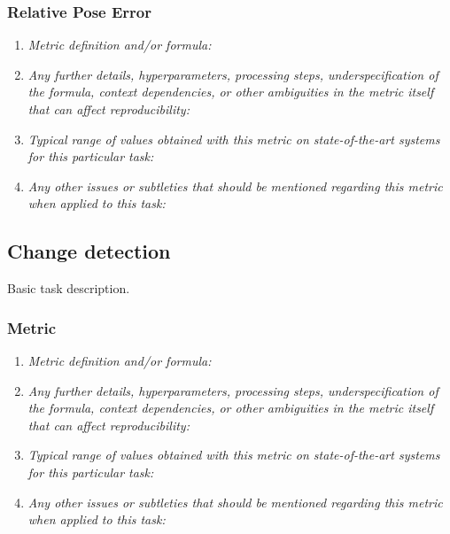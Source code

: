 \documentclass[a4paper,11pt]{article}
\begin{document}
        \subsubsection{Relative Pose Error}
            \begin{enumerate}[label=\alph*.]
                \item \textit{Metric definition and/or formula:}
                \bigskip
                \item \textit{Any further details, hyperparameters, processing steps, underspecification of the formula, context dependencies, or other ambiguities in the metric itself that can affect reproducibility:}
                \bigskip
                \item \textit{Typical range of values obtained with this metric on state-of-the-art systems for this particular task:}
                \bigskip
                \item \textit{Any other issues or subtleties that should be mentioned regarding this metric when applied to this task:}
                \bigskip
            \end{enumerate}

    \subsection{Change detection}
        Basic task description.
        \subsubsection{Metric}
            \begin{enumerate}[label=\alph*.]
                \item \textit{Metric definition and/or formula:}
                \bigskip
                \item \textit{Any further details, hyperparameters, processing steps, underspecification of the formula, context dependencies, or other ambiguities in the metric itself that can affect reproducibility:}
                \bigskip
                \item \textit{Typical range of values obtained with this metric on state-of-the-art systems for this particular task:}
                \bigskip
                \item \textit{Any other issues or subtleties that should be mentioned regarding this metric when applied to this task:}
                \bigskip
            \end{enumerate}
\end{document}
